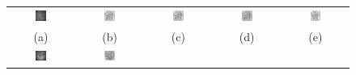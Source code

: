 \documentclass{IEEEtran}
\begin{document}
\begin{figure}[t]
\centering
\begin{tabular}{@{}c c c c c@{}} %
\includegraphics[width=0.18\textwidth]{figs/fibre/03_fibre_ccm} &
\includegraphics[width=0.18\textwidth]{figs/fibre/03_fibre_segmentation_gabor_inv} &
\includegraphics[width=0.18\textwidth]{figs/fibre/03_fibre_segmentation_gh2da_inv} &
\includegraphics[width=0.18\textwidth]{figs/fibre/03_fibre_segmentation_mono_inv} &
\includegraphics[width=0.18\textwidth]{figs/fibre/03_fibre_segmentation_dt_inv} \\
(a) & (b) & (c) & (d) & (e) \\
\noalign{\smallskip}
%
\includegraphics[width=0.18\textwidth]{figs/fibre/51_fibre_ccm} &
\includegraphics[width=0.18\textwidth]{figs/fibre/51_fibre_segmentation_gabor_inv} &

\end{tabular}
\end{figure}
\end{document}
